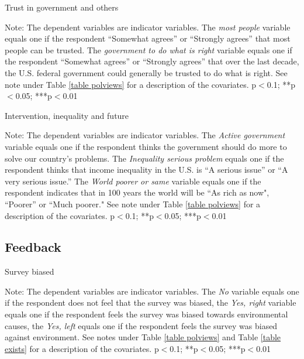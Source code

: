 \documentclass{article}
\begin{document}
\begin{table}[h!]
	\caption{Trust in government and others}
	\begin{center}
		\scalebox{0.7}{}
	\end{center}
	{\footnotesize Note: The dependent variables are indicator variables. The \textit{most people} variable equals one if the respondent ``Somewhat agrees'' or ``Strongly agrees'' that most people can be trusted. The \textit{government to do what is right} variable equals one if the respondent ``Somewhat agrees'' or ``Strongly agrees'' that over the last decade, the U.S. federal government could generally be trusted to do what is right.
	See note under Table \ref{table polviews} for a description of the covariates.
		\newline *p$<$0.1; **p$<$0.05; ***p$<$0.01}	
\end{table}	

\begin{table}[h!]
	\caption{Intervention, inequality and future}
	\begin{center}
		\scalebox{0.7}{}
	\end{center}
	{\footnotesize Note: The dependent variables are indicator variables. The \textit{Active government} variable equals one if the respondent thinks the government should do more to solve our country's problems. The \textit{Inequality serious problem} equals one if the respondent thinks that income inequality in the U.S. is ``A serious issue'' or ``A very serious issue.'' The \textit{World poorer or same} variable equals one if the respondent indicates that in 100 years the world will be ``As rich as now", ``Poorer'' or ``Much poorer."
	See note under Table \ref{table polviews} for a description of the covariates.
	\newline *p$<$0.1; **p$<$0.05; ***p$<$0.01}
\end{table}	



\clearpage
\subsection{Feedback}



\begin{table}[h!]
	\caption{Survey biased}
	\begin{center}
		\scalebox{0.7}{}
	\end{center}
	{\footnotesize Note: The dependent variables are indicator variables. The \textit{No} variable equals one if the respondent does not feel that the survey was biased, the \textit{Yes, right} variable equals one if the respondent feels the survey was biased towards environmental causes, the \textit{Yes, left} equals one if the respondent feels the survey was biased against environment. See notes under Table \ref{table polviews} and Table \ref{table exists} for a description of the covariates.
	\newline *p$<$0.1; **p$<$0.05; ***p$<$0.01}
\end{table}	
\end{document}
